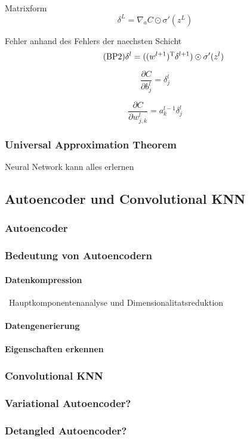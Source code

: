 \documentclass[../main]{subfiles}
\begin{document}
Matrixform
\begin{equation}\tag{BP1a}
  \delta^L = \nabla_aC \odot \sigma'(z^L)
\end{equation}

Fehler anhand des Fehlers der naechsten Schicht
\begin{equation}\tag{BP2}
  \delta^l = ((w^{l+1})^\mathrm{T} \delta^{l+1}) \odot \sigma'(z^l)
\end{equation}

\begin{equation}\tag{BP3}
  \frac{\partial C}{\partial b_j^l} = \delta_j^l
\end{equation}

\begin{equation}\tag{BP4}
  \frac{\partial C}{\partial w_{j,k}^l} = a_k^{l-1} \delta_j^l
\end{equation}



\subsubsection{Universal Approximation Theorem}\label{sec:UAT}
Neural Network kann alles erlernen

\subsection{Autoencoder und Convolutional KNN}
\subsubsection{Autoencoder}
\subsubsection{Bedeutung von Autoencodern}
\paragraph{Datenkompression}
~Hauptkomponentenanalyse und Dimensionalitatsreduktion
\paragraph{Datengenerierung}
\paragraph{Eigenschaften erkennen}

\subsubsection{Convolutional KNN}

\subsubsection{Variational Autoencoder?}
\subsubsection{Detangled Autoencoder?}
\end{document}
